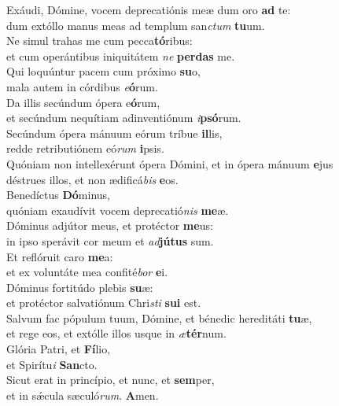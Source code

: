 \evenverse Exáudi, Dómine, vocem deprecatiónis meæ dum oro \textbf{ad} te:~\*\\
\evenverse dum extóllo manus meas ad templum san\textit{ctum} \textbf{tu}um.\\
\oddverse Ne simul trahas me cum pecca\textbf{tó}ribus:~\*\\
\oddverse et cum operántibus iniquitátem \textit{ne} \textbf{per}\textbf{das} me.\\
\evenverse Qui loquúntur pacem cum próximo \textbf{su}o,~\*\\
\evenverse mala autem in córdibus \textit{e}\textbf{ó}rum.\\
\oddverse Da illis secúndum ópera e\textbf{ó}rum,~\*\\
\oddverse et secúndum nequítiam adinventiónum \textit{i}\textbf{psó}rum.\\
\evenverse Secúndum ópera mánuum eórum tríbue \textbf{il}lis,~\*\\
\evenverse redde retributiónem eó\textit{rum} \textbf{i}psis.\\
\oddverse Quóniam non intellexérunt ópera Dómini, et in ópera mánuum \textbf{e}jus~\*\\
\oddverse déstrues illos, et non ædificá\textit{bis} \textbf{e}os.\\
\evenverse Benedíctus \textbf{Dó}minus,~\*\\
\evenverse quóniam exaudívit vocem deprecatió\textit{nis} \textbf{me}æ.\\
\oddverse Dóminus adjútor meus, et protéctor \textbf{me}us:~\*\\
\oddverse in ipso sperávit cor meum et \textit{ad}\textbf{jú}\textbf{tus} sum.\\
\evenverse Et reflóruit caro \textbf{me}a:~\*\\
\evenverse et ex voluntáte mea confité\textit{bor} \textbf{e}i.\\
\oddverse Dóminus fortitúdo plebis \textbf{su}æ:~\*\\
\oddverse et protéctor salvatiónum Chri\textit{sti} \textbf{su}\textbf{i} est.\\
\evenverse Salvum fac pópulum tuum, Dómine, et bénedic hereditáti \textbf{tu}æ,~\*\\
\evenverse et rege eos, et extólle illos usque in \textit{æ}\textbf{tér}num.\\
\oddverse Glória Patri, et \textbf{Fí}lio,~\*\\
\oddverse et Spirítu\textit{i} \textbf{San}cto.\\
\evenverse Sicut erat in princípio, et nunc, et \textbf{sem}per,~\*\\
\evenverse et in sǽcula sæculó\textit{rum}. \textbf{A}men.\\
